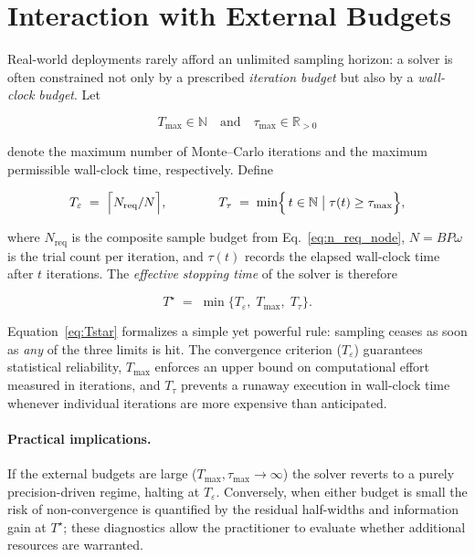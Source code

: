 \section{Interaction with External Budgets}
\label{subsec:conv_budget}

Real-world deployments rarely afford an unlimited sampling horizon: a solver is
often constrained not only by a prescribed \emph{iteration budget} but also by a
\emph{wall-clock budget}.  Let  

\[
  T_{\max}\in\mathbb{N}            \quad\text{and}\quad
  \tau_{\max}\in\mathbb{R}_{>0}
\]

denote the maximum number of Monte–Carlo iterations and the maximum permissible
wall-clock time, respectively.  Define  

\[
  T_{\varepsilon}
    \;=\;
    \Bigl\lceil N_{\text{req}}/N\Bigr\rceil ,
    \qquad\qquad
  T_{\tau}
    \;=\;
    \min\Bigl\{\,t\in\mathbb{N}\;\bigl|\;
                 \tau(t)\ge\tau_{\max}\Bigr\},
\]

where $N_{\text{req}}$ is the composite sample budget from
Eq.~\eqref{eq:n_req_node}, $N=B P \omega$ is the trial count per iteration, and
$\tau(t)$ records the elapsed wall-clock time after $t$ iterations.  The
\emph{effective stopping time} of the solver is therefore

\begin{equation}
  T^\star
  \;=\;
  \min\!\bigl\{
          T_{\varepsilon},\;
          T_{\max},\;
          T_{\tau}
        \bigr\}.
  \label{eq:Tstar}
\end{equation}

Equation~\eqref{eq:Tstar} formalizes a simple yet powerful rule: sampling ceases
as soon as \emph{any} of the three limits is hit.  The convergence criterion
($T_{\varepsilon}$) guarantees statistical reliability, $T_{\max}$ enforces an
upper bound on computational effort measured in iterations, and
$T_{\tau}$ prevents a runaway execution in wall-clock time whenever individual
iterations are more expensive than anticipated.

\paragraph*{Practical implications.}  If the external budgets are large
($T_{\max},\tau_{\max}\rightarrow\infty$) the solver reverts to a
purely precision-driven regime, halting at $T_{\varepsilon}$.  Conversely, when
either budget is small the risk of non-convergence is quantified by the
residual half-widths and information gain at $T^\star$; these diagnostics allow
the practitioner to evaluate whether additional resources are warranted.

